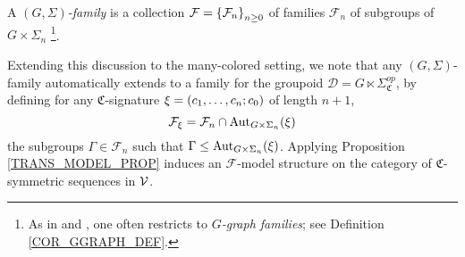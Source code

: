 \documentclass[a4paper,10pt
,draft
]{article}%
\renewcommand{\F}{\mathcal F}
\renewcommand{\1}{\eta}%
\begin{document}
\begin{definition}
      \label{GSFAM_DEF}
      A \textit{$(G, \Sigma)$-family} is a collection $\F = \set{\F_n}_{n \geq 0}$ of families $\F_n$ of subgroups of $G \times \Sigma_n$ \footnote{
        As in \cite{BP_geo} and \cite{BH15}, one often restricts to \textit{$G$-graph families}; see Definition \ref{COR_GGRAPH_DEF}.}.
\end{definition}

  
        

Extending this discussion to the many-colored setting, we note that
any $(G,\Sigma)$-family automatically extends to a family for the groupoid $\mathcal D = G \ltimes \Sigma_{\mathfrak C}^{op}$,
by defining for any $\mathfrak C$-signature $\xi = (c_1,\dots,c_n;c_0)$ of length $n+1$,
\[
      \F_\ksi = \F_n \cap \Aut_{G \times \Sigma_n}(\ksi)
\]
the subgroups $\Gamma \in \F_n$ such that $\Gamma \leq \operatorname{Aut}_{G \times \Sigma_n}(\xi)$.
Applying Proposition \ref{TRANS_MODEL_PROP} induces an $\F$-model structure on the category of $\mathfrak C$-symmetric sequences in $\mathcal V$.
\end{document}

